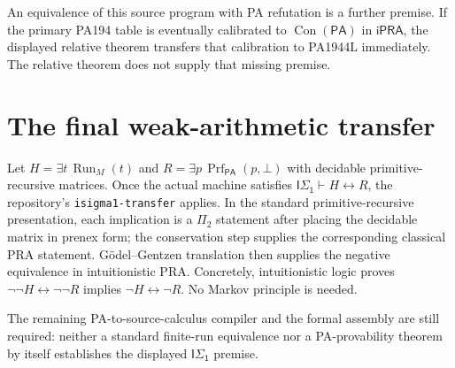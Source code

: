 \documentclass[11pt]{article}
\newcommand{\ipra}{\mathsf{iPRA}}
\newcommand{\pa}{\mathsf{PA}}
\newcommand{\isone}{\mathsf{I\Sigma_1}}
\begin{document}
An equivalence of this source program with PA refutation is a further
premise. If the primary PA194 table is eventually calibrated to
$\operatorname{Con}(\pa)$ in $\ipra$, the displayed relative theorem
transfers that calibration to PA1944L immediately. The relative theorem
does not supply that missing premise.

\section{The final weak-arithmetic transfer}

Let $H=\exists t\,\operatorname{Run}_M(t)$ and
$R=\exists p\,\operatorname{Prf}_{\pa}(p,\bot)$ with decidable
primitive-recursive matrices. Once the actual machine satisfies
$\isone\vdash H\leftrightarrow R$, the repository's
\texttt{isigma1-transfer} applies. In the standard primitive-recursive
presentation, each implication is a $\Pi_2$ statement after placing the
decidable matrix in prenex form; the conservation step supplies the
corresponding classical PRA statement. G\"odel--Gentzen translation then
supplies the negative equivalence in intuitionistic PRA. Concretely,
intuitionistic logic proves $\neg\neg H\leftrightarrow\neg\neg R$
implies $\neg H\leftrightarrow\neg R$. No Markov principle is needed.

The remaining PA-to-source-calculus compiler and the formal assembly are
still required: neither a standard finite-run equivalence nor a
PA-provability theorem by itself establishes the displayed $\isone$ premise.
\end{document}
